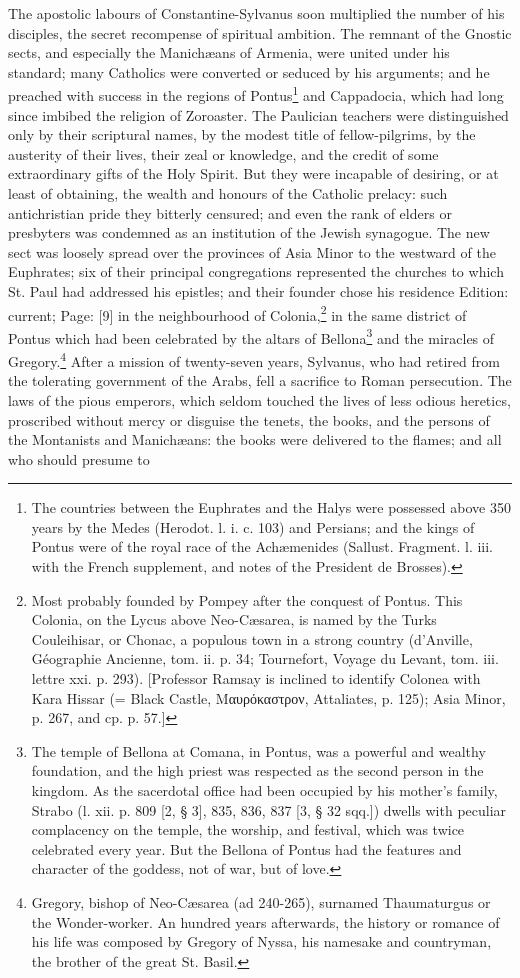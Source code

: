 The apostolic labours of Constantine-Sylvanus soon multiplied the number of his disciples, the secret recompense of spiritual ambition. The remnant of the Gnostic sects, and especially the Manichæans of Armenia, were united under his standard; many Catholics were converted or seduced by his arguments; and he preached with success in the regions of Pontus\footnote{The countries between the Euphrates and the Halys were possessed above 350 years by the Medes (Herodot. l. i. c. 103) and Persians; and the kings of Pontus were of the royal race of the Achæmenides (Sallust. Fragment. l. iii. with the French supplement, and notes of the President de Brosses).} and Cappadocia, which had long since imbibed the religion of Zoroaster. The Paulician teachers were distinguished only by their scriptural names, by the modest title of fellow-pilgrims, by the austerity of their lives, their zeal or knowledge, and the credit of some extraordinary gifts of the Holy Spirit. But they were incapable of desiring, or at least of obtaining, the wealth and honours of the Catholic prelacy: such antichristian pride they bitterly censured; and even the rank of elders or presbyters was condemned as an institution of the Jewish synagogue. The new sect was loosely spread over the provinces of Asia Minor to the westward of the Euphrates; six of their principal congregations represented the churches to which St. Paul had addressed his epistles; and their founder chose his residence Edition: current; Page: [9] in the neighbourhood of Colonia,\footnote{Most probably founded by Pompey after the conquest of Pontus. This Colonia, on the Lycus above Neo-Cæsarea, is named by the Turks Couleihisar, or Chonac, a populous town in a strong country (d\texthebrew{}’Anville, Géographie Ancienne, tom. ii. p. 34; Tournefort, Voyage du Levant, tom. iii. lettre xxi. p. 293). [Professor Ramsay is inclined to identify Colonea with Kara Hissar (= Black Castle, \textgreek{Μαυρόκαστρον}, Attaliates, p. 125); Asia Minor, p. 267, and cp. p. 57.]} in the same district of Pontus which had been celebrated by the altars of Bellona\footnote{The temple of Bellona at Comana, in Pontus, was a powerful and wealthy foundation, and the high priest was respected as the second person in the kingdom. As the sacerdotal office had been occupied by his mother\texthebrew{}’s family, Strabo (l. xii. p. 809 [2, § 3], 835, 836, 837 [3, § 32 sqq.]) dwells with peculiar complacency on the temple, the worship, and festival, which was twice celebrated every year. But the Bellona of Pontus had the features and character of the goddess, not of war, but of love.} and the miracles of Gregory.\footnote{Gregory, bishop of Neo-Cæsarea (ad 240-265), surnamed Thaumaturgus or the Wonder-worker. An hundred years afterwards, the history or romance of his life was composed by Gregory of Nyssa, his namesake and countryman, the brother of the great St. Basil.} After a mission of twenty-seven years, Sylvanus, who had retired from the tolerating government of the Arabs, fell a sacrifice to Roman persecution. The laws of the pious emperors, which seldom touched the lives of less odious heretics, proscribed without mercy or disguise the tenets, the books, and the persons of the Montanists and Manichæans: the books were delivered to the flames; and all who should presume to 